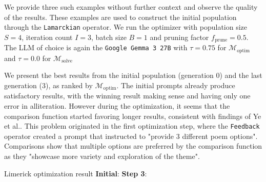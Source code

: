We provide three such examples without further context and observe the quality of the results. These examples are used to construct the initial population through
the \texttt{Lamarckian} operator.
We run the optimizer with population size $S=4$, iteration count $I=3$, batch size $B=1$ and pruning factor $f_{\text{prune}} = 0.5$.
The LLM of choice is again the \texttt{Google Gemma 3 27B} with $\tau = 0.75$ for $\mathcal{M}_{\text{optim}}$ and $\tau = 0.0$ for $\mathcal{M}_{\text{solve}}$

We present the best results from the initial population (generation $0$) and the last generation ($3$), as ranked by $\mathcal{M}_{\text{optim}}$.
The initial prompts already produce satisfactory results, with the winning result making sense and having only one error in alliteration.
However during the optimization, it seems that the comparison function started favoring longer results, consistent with findings of Ye et al.\cite{ye2024justiceprejudicequantifyingbiases}.
This problem originated in the first optimization step, where the \texttt{Feedback} operator created a prompt that instructed to "provide 3 different poem options".
Comparisons show that multiple options are preferred by the comparison function as they "showcase more variety and exploration of the theme".

\begin{promptbox}[label={box:limerickresult}]{Limerick optimization result}
\textbf{Initial}:
\textbf{Step 3}:
\end{promptbox}

